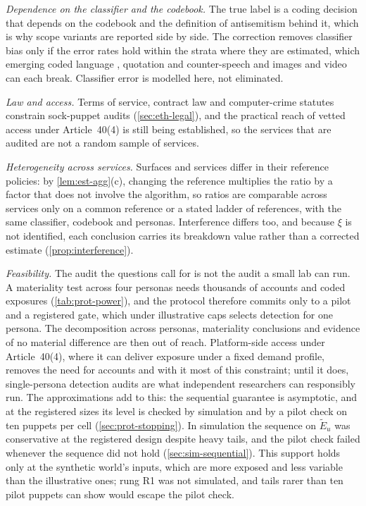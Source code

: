 \emph{Dependence on the classifier and the codebook.} The true label is a
coding decision that depends on the codebook and the definition of
antisemitism behind it, which is why scope variants are reported side by
side. The correction removes classifier bias only if the error rates hold
within the strata where they are estimated, which emerging coded language
\citep{zannettou2020}, quotation and counter-speech \citep{rottger2021} and
images and video can each break. Classifier error is modelled here, not
eliminated.

\emph{Law and access.} Terms of service, contract law and
computer-crime statutes constrain sock-puppet audits (\cref{sec:eth-legal}),
and the practical reach of vetted access under Article~40(4) is still being
established, so the services that are audited are not a random sample of
services.

\emph{Heterogeneity across services.} Surfaces and services differ in their
reference policies: by
\cref{lem:est-agg}(c), changing the reference multiplies the ratio by a
factor that does not involve the algorithm, so ratios are comparable across
services only on a common reference or a stated ladder of references, with
the same classifier, codebook and personas. Interference differs too, and
because $\xi$ is not identified, each conclusion carries its breakdown value
rather than a corrected estimate (\cref{prop:interference}).

\emph{Feasibility.} The audit the questions call for is not the audit a
small lab can run. A materiality test across four personas needs thousands of
accounts and coded exposures (\cref{tab:prot-power}), and the protocol
therefore commits only to a pilot and a registered gate, which under
illustrative caps selects detection for one persona. The decomposition across
personas, materiality conclusions and evidence of no material difference are
then out of reach. Platform-side access under Article~40(4), where it can
deliver exposure under a fixed demand profile, removes the need for accounts
and with it most of this constraint; until it does, single-persona detection
audits are what independent researchers can responsibly run. The
approximations add to this: the sequential guarantee is asymptotic, and at
the registered sizes its level is checked by simulation and by a pilot check
on ten puppets per cell (\cref{sec:prot-stopping}). In simulation the
sequence on $\widetilde E_u$ was conservative at the registered design
despite heavy tails, and the pilot check failed whenever the sequence did not
hold (\cref{sec:sim-sequential}). This support holds only at the synthetic
world's inputs, which are more exposed and less variable than the
illustrative ones; rung R1 was not simulated, and tails rarer than ten pilot
puppets can show would escape the pilot check.

